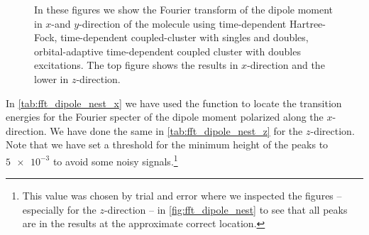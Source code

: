 \begin{figure}
            \caption{In these figures we show the Fourier transform of the
            dipole moment in $x$-and $y$-direction of the  molecule
            using time-dependent Hartree-Fock, time-dependent coupled-cluster
            with singles and doubles, orbital-adaptive time-dependent coupled
            cluster with doubles excitations.
            The top figure shows the results in $x$-direction and the lower
            in $z$-direction.}
            \label{fig:fft_dipole_nest}
        \end{figure}
        In \autoref{tab:fft_dipole_nest_x} we have used the function
         \cite{scipy} to locate the transition
        energies for the Fourier specter of the dipole moment polarized along
        the $x$-direction.
        We have done the same in \autoref{tab:fft_dipole_nest_z} for the
        $z$-direction.
        Note that we have set a threshold for the minimum height of the peaks to
        $\num{5e-3}$ to avoid some noisy signals.\footnote{%
            This value was chosen by trial and error where we inspected the
            figures --especially for the $z$-direction -- in
            \autoref{fig:fft_dipole_nest} to see that all peaks are in the
            results at the approximate correct location.
        }

